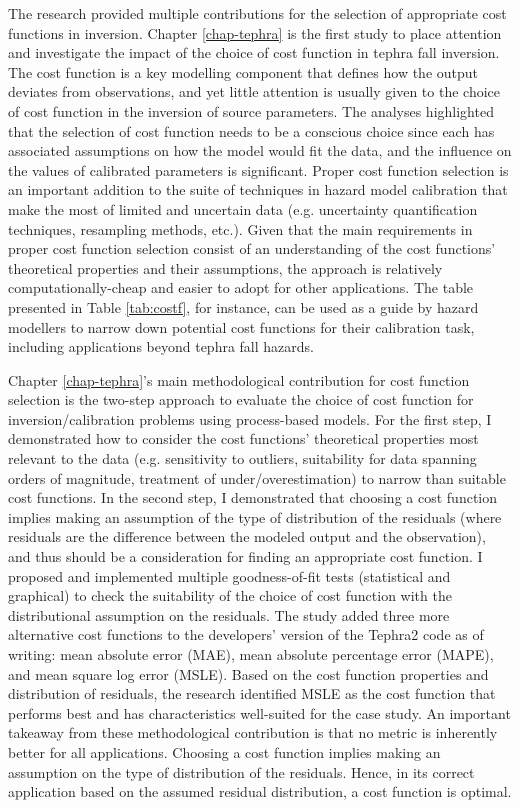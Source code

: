 The research provided multiple contributions for the selection of appropriate cost functions in inversion. Chapter \ref{chap-tephra} is the first study to place attention and investigate the impact of the choice of cost function in tephra fall inversion. The cost function is a key modelling component that defines how the output deviates from observations, and yet little attention is usually given to the choice of cost function in the inversion of source parameters. The analyses highlighted that the selection of cost function needs to be a conscious choice since each has associated assumptions on how the model would fit the data, and the influence on the values of calibrated parameters is significant. Proper cost function selection is an important addition to the suite of techniques in hazard model calibration that make the most of limited and uncertain data (e.g. uncertainty quantification techniques, resampling methods, etc.). Given that the main requirements in proper cost function selection consist of an understanding of the cost functions' theoretical properties and their assumptions, the approach is relatively computationally-cheap and easier to adopt for other applications. The table presented in Table \ref{tab:costf}, for instance, can be used as a guide by hazard modellers to narrow down potential cost functions for their calibration task, including applications beyond tephra fall hazards.

Chapter \ref{chap-tephra}'s main methodological contribution for cost function selection is the two-step approach to evaluate the choice of cost function for inversion/calibration problems using process-based models. For the first step, I demonstrated how to consider the cost functions' theoretical properties most relevant to the data (e.g. sensitivity to outliers, suitability for data spanning orders of magnitude, treatment of under/overestimation) to narrow than suitable cost functions. In the second step, I demonstrated that choosing a cost function implies making an assumption of the type of distribution of the residuals (where residuals are the difference between the modeled output and the observation), and thus should be a consideration for finding an appropriate cost function. I proposed and implemented multiple goodness-of-fit tests (statistical and graphical) to check the suitability of the choice of cost function with the distributional assumption on the residuals. The study added three more alternative cost functions to the developers' version of the Tephra2 code as of writing: mean absolute error (MAE), mean absolute percentage error (MAPE), and mean square log error (MSLE). Based on the cost function properties and distribution of residuals, the research identified MSLE as the cost function that performs best and has characteristics well-suited for the case study. An important takeaway from these methodological contribution is that no metric is inherently better for all applications. Choosing a cost function implies making an assumption on the type of distribution of the residuals. Hence, in its correct application based on the assumed residual distribution, a cost function is optimal.

